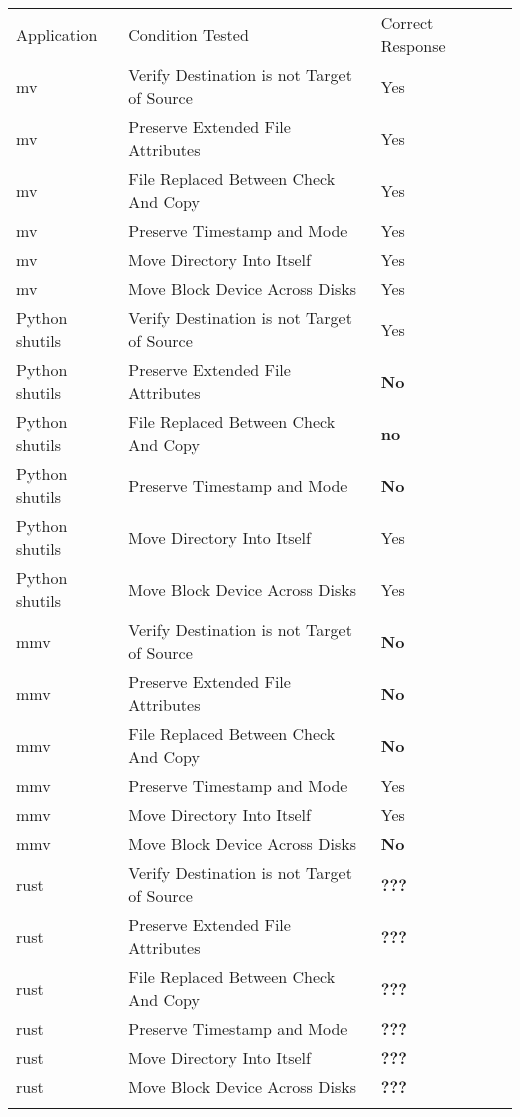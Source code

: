         
            \begin{table}[H]
                \scriptsize{}
                \begin{tabular}{l  l  l  l}
                \toprule{}
                  Application & Condition Tested & Correct Response\\
                  mv & Verify Destination is not Target of Source & Yes\\
                  mv & Preserve Extended File Attributes & Yes\\
                  mv & File Replaced Between Check And Copy & Yes\\
                  mv & Preserve Timestamp and Mode & Yes\\
                  mv & Move Directory Into Itself & Yes\\
                  mv & Move Block Device Across Disks & Yes\\
                  Python shutils & Verify Destination is not Target of Source & Yes\\
                  Python shutils & Preserve Extended File Attributes & \textbf{No}\\
                  Python shutils  & File Replaced Between Check And Copy & \textbf{no}\\
                  Python shutils  & Preserve Timestamp and Mode & \textbf{No}\\
                  Python shutils  & Move Directory Into Itself & Yes\\
                  Python shutils  & Move Block Device Across Disks & Yes\\
                  mmv & Verify Destination is not Target of Source& \textbf{No}\\
                  mmv & Preserve Extended File Attributes & \textbf{No}\\
                  mmv & File Replaced Between Check And Copy & \textbf{No}\\
                  mmv & Preserve Timestamp and Mode & Yes\\
                  mmv & Move Directory Into Itself & Yes\\
                  mmv & Move Block Device Across Disks & \textbf{No}\\
                  rust & Verify Destination is not Target of Source& \textbf{???}\\
                  rust & Preserve Extended File Attributes & \textbf{???}\\
                  rust & File Replaced Between Check And Copy & \textbf{???}\\
                  rust & Preserve Timestamp and Mode & \textbf{???}\\
                  rust & Move Directory Into Itself & \textbf{???}\\
                  rust & Move Block Device Across Disks & \textbf{???}\\
                \bottomrule{}
                \end{tabular}
            \end{table}

